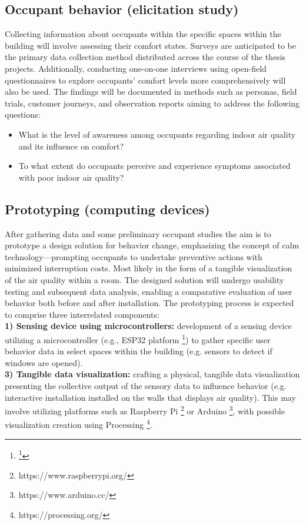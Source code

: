 \subsection{Occupant behavior (elicitation study)}

Collecting information about occupants within the specific spaces within the building will involve assessing their comfort states. Surveys are anticipated to be the primary data collection method distributed across the course of the thesis projects. Additionally, conducting one-on-one interviews using open-field questionnaires to explore occupants' comfort levels more comprehensively will also be used. The findings will be documented in methods such as personas, field trials, customer journeys, and observation reports aiming to address the following questions:

\begin{itemize}
  \item What is the level of awareness among occupants regarding indoor air quality and its influence on comfort?
  \item To what extent do occupants perceive and experience symptoms associated with poor indoor air quality?
\end{itemize}

\subsection{Prototyping (computing devices)}

After gathering data and some preliminary occupant studies the aim is to prototype a design solution for behavior change, emphasizing the concept of calm technology—prompting occupants to undertake preventive actions with minimized interruption costs. Most likely in the form of a tangible visualization of the air quality within a room. The designed solution will undergo usability testing and subsequent data analysis, enabling a comparative evaluation of user behavior both before and after installation. The prototyping process is expected to comprise three interrelated components: \\

\textbf{1) Sensing device using microcontrollers: } development of a sensing device utilizing a microcontroller (e.g., ESP32 platform \footnote{\footnote{https://www.espressif.com/en/products/socs/esp32}}) to gather specific user behavior data in select spaces within the building (e.g. sensors to detect if windows are opened). \\
\textbf{3) Tangible data visualization: } crafting a physical, tangible data visualization presenting the collective output of the sensory data to influence behavior (e.g. interactive installation installed on the walls that displays air quality). This may involve utilizing platforms such as Raspberry Pi \footnote{https://www.raspberrypi.org/} or Arduino \footnote{https://www.arduino.cc/}, with possible visualization creation using Processing \footnote{https://processing.org/}.


